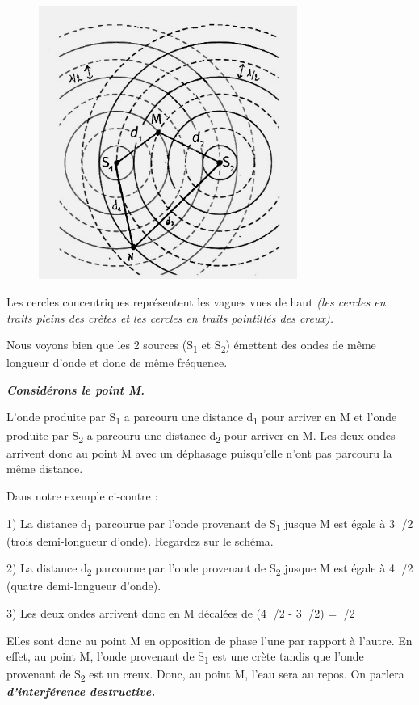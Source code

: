 \begin{figure}
\centering
\includegraphics[width=8.47cm,height=8.927cm]{Pictures/10000001000001DE000001F885F9EB969C92123B.png}
\caption{}
\end{figure}

Les cercles concentriques représentent les vagues vues de haut
\emph{(les cercles en traits pleins des crètes et les cercles en traits
pointillés des creux).}\textbf{ }

Nous voyons bien que les 2 sources (S\textsubscript{1} et
S\textsubscript{2}) émettent des ondes de même longueur d'onde et donc
de même fréquence.

\emph{\textbf{Considérons le point M. }}

L'onde produite par S\textsubscript{1} a parcouru une distance
d\textsubscript{1} pour arriver en M et l'onde produite par
S\textsubscript{2} a parcouru une distance d\textsubscript{2} pour
arriver en M. Les deux ondes arrivent donc au point M avec un déphasage
puisqu'elle n'ont pas parcouru la même distance.

Dans notre exemple ci-contre :

1) La distance d\textsubscript{1} parcourue par l'onde provenant de
S\textsubscript{1} jusque M est égale à 3 /2 (trois demi-longueur
d'onde). Regardez sur le schéma.

2) La distance d\textsubscript{2} parcourue par l'onde provenant de
S\textsubscript{2} jusque M est égale à 4 /2 (quatre demi-longueur
d'onde).

3) Les deux ondes arrivent donc en M décalées de (4 /2 - 3 /2) = /2

Elles sont donc au point M en opposition de phase l'une par rapport à
l'autre. En effet, au point M, l'onde provenant de S\textsubscript{1}
est une crète tandis que l'onde provenant de S\textsubscript{2} est un
creux. Donc, au point M, l'eau sera au repos. On parlera
\emph{\textbf{d'interférence destructive.}}

